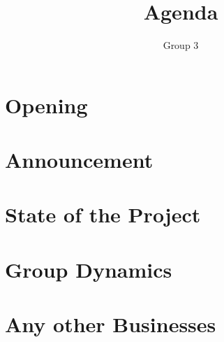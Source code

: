\documentclass{article}
\title{Agenda}
\author{Group 3}
\begin{document}
\maketitle
\section{Opening}
\section{Announcement}
\section{State of the Project}
\section{Group Dynamics}
\section{Any other Businesses}
\end{document}
